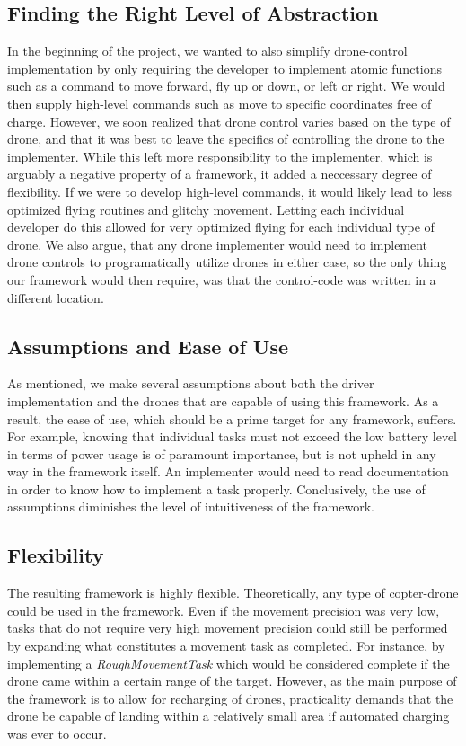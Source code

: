 \subsection{Finding the Right Level of Abstraction}
In the beginning of the project, we wanted to also simplify drone-control implementation by only requiring the developer to implement atomic functions such as a command to move forward, fly up or down, or left or right. We would then supply high-level commands such as move to specific coordinates free of charge. However, we soon realized that drone control varies based on the type of drone, and that it was best to leave the specifics of controlling the drone to the implementer. While this left more responsibility to the implementer, which is arguably a negative property of a framework, it added a neccessary degree of flexibility. If we were to develop high-level commands, it would likely lead to less optimized flying routines and glitchy movement. Letting each individual developer do this allowed for very optimized flying for each individual type of drone. We also argue, that any drone implementer would need to implement drone controls to programatically utilize drones in either case, so the only thing our framework would then require, was that the control-code was written in a different location.

\subsection{Assumptions and Ease of Use}
As mentioned, we make several assumptions about both the driver implementation and the drones that are capable of using this framework. As a result, the ease of use, which should be a prime target for any framework, suffers. For example, knowing that individual tasks must not exceed the low battery level in terms of power usage is of paramount importance, but is not upheld in any way in the framework itself. An implementer would need to read documentation in order to know how to implement a task properly. Conclusively, the use of assumptions diminishes the level of intuitiveness of the framework.

\subsection{Flexibility}
The resulting framework is highly flexible. Theoretically, any type of copter-drone could be used in the framework. Even if the movement precision was very low, tasks that do not require very high movement precision could still be performed by expanding what constitutes a movement task as completed. For instance, by implementing a \textit{RoughMovementTask} which would be considered complete if the drone came within a certain range of the target. However, as the main purpose of the framework is to allow for recharging of drones, practicality demands that the drone be capable of landing within a relatively small area if automated charging was ever to occur.

